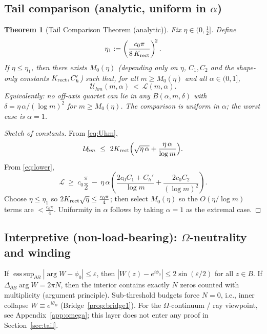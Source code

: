 \documentclass[11pt]{article}
\numberwithin{equation}{section}
\newtheorem{theorem}{Theorem}[section]
\theoremstyle{remark}
\begin{document}
\subsection{Tail comparison (analytic, uniform in \texorpdfstring{$\alpha$}{alpha})}\label{subsec:comparison}

\begin{theorem}[Tail Comparison Theorem (analytic)]\label{thm:tail}
Fix $\eta\in(0,\tfrac12]$. Define
\[
\eta_1:=\left(\frac{c_0\pi}{8\,K_{\rm rect}}\right)^{\!2}.
\]
If $\eta\le\eta_1$, then there exists $M_0(\eta)$ (depending only on $\eta$, $C_1,C_2$ and the shape-only constants $K_{\rm rect},C_h'$) such that, for all $m\ge M_0(\eta)$ and all $\alpha\in(0,1]$,
\[
\mathcal{U}_{\!hm}(m,\alpha)\ <\ \mathcal{L}(m,\alpha).
\]
Equivalently: no off-axis quartet can lie in any $B(\alpha,m,\delta)$ with $\delta=\eta\,\alpha/(\log m)^2$ for $m\ge M_0(\eta)$. The comparison is uniform in $\alpha$; the worst case is $\alpha=1$.
\end{theorem}

\begin{proof}[Sketch of constants]
From \eqref{eq:Uhm},
\[
\mathcal{U}_{\!hm}\ \le\ 2K_{\rm rect}\Big(\sqrt{\eta\,\alpha}+\frac{\eta\,\alpha}{\log m}\Big).
\]
From \eqref{eq:lower},
\[
\mathcal{L}\ \ge\ c_0\frac{\pi}{2}\ -\ \eta\,\alpha\left(\frac{2c_0C_1+C_h'}{\log m}+\frac{2c_0C_2}{(\log m)^2}\right).
\]
Choose $\eta\le\eta_1$ so $2K_{\rm rect}\sqrt{\eta}\le \tfrac{c_0\pi}{4}$; then select $M_0(\eta)$ so the $O(\eta/\log m)$ terms are $<\tfrac{c_0\pi}{4}$. Uniformity in $\alpha$ follows by taking $\alpha=1$ as the extremal case.
\end{proof}

\subsection{Interpretive (non-load-bearing): $\Omega$-neutrality and winding}\label{subsec:omega}

If $\operatorname*{ess\,sup}_{\partial B}|\arg W-\phi_0|\le \varepsilon$, then $|W(z)-e^{i\phi_0}|\le 2\sin(\varepsilon/2)$ for all $z\in B$. If $\Delta_{\partial B}\arg W=2\pi N$, then the interior contains exactly $N$ zeros counted with multiplicity (argument principle). Sub-threshold budgets force $N=0$, i.e., inner collapse $W\equiv e^{i\theta_B}$ (Bridge~\ref{prop:bridge1}). For the $\Omega$-continuum / ray viewpoint, see Appendix~\ref{app:omega}; this layer does not enter any proof in Section~\ref{sec:tail}.
\end{document}
